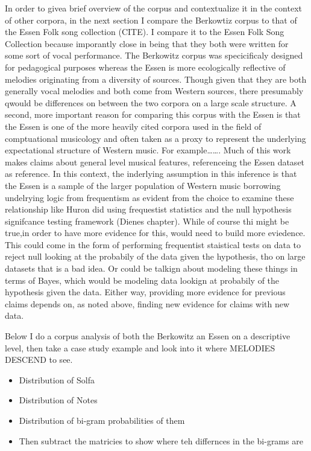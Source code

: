 \documentclass[]{book}
\providecommand{\tightlist}{%
  \setlength{\itemsep}{0pt}\setlength{\parskip}{0pt}}
\begin{document}
In order to givea brief overview of the corpus and contextualize it in the context of other corpora, in the next section I compare the Berkowtiz corpus to that of the Essen Folk song collection (CITE).
I compare it to the Essen Folk Song Collection because imporantly close in being that they both were written for some sort of vocal performance.
The Berkowitz corpus was specicificaly designed for pedagogical purposes whereas the Essen is more ecologically reflective of melodies originating from a diversity of sources.
Though given that they are both generally vocal melodies and both come from Western sources, there presumably qwould be differences on between the two corpora on a large scale structure.
A second, more important reason for comparing this corpus with the Essen is that the Essen is one of the more heavily cited corpora used in the field of comptuational musicology and often taken as a proxy to represent the underlying expectational structure of Western music.
For example\ldots{}\ldots{}.
Much of this work makes claims about general level musical features, referenceing the Essen dataset as reference.
In this context, the inderlying assumption in this inference is that the Essen is a sample of the larger population of Western music borrowing undelrying logic from frequentism as evident from the choice to examine these relationship like Huron did using frequestist statistics and the null hypothesis signifcance testing framework (Dienes chapter).
While of course thi might be true,in order to have more evidence for this, would need to build more eviedence.
This could come in the form of performing frequentist staistical tests on data to reject null looking at the probabily of the data given the hypothesis, tho on large datasets that is a bad idea.
Or could be talkign about modeling these things in terms of Bayes, which would be modeling data lookign at probabily of the hypothesis given the data.
Either way, providing more evidence for previous claims depends on, as noted above, finding new evidence for claims with new data.

Below I do a corpus analysis of both the Berkowitz an Essen on a descriptive level, then take a case study example and look into it where MELODIES DESCEND to see.

\begin{itemize}
\tightlist
\item
  Distribution of Solfa
\item
  Distribution of Notes
\item
  Distribution of bi-gram probabilities of them
\item
  Then subtract the matricies to show where teh differnces in the bi-grams are
\end{itemize}
\end{document}
